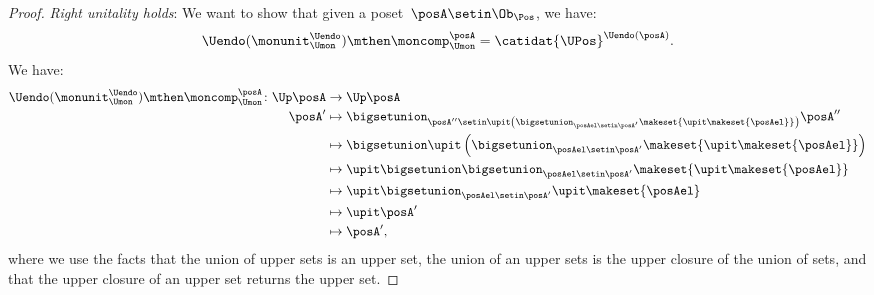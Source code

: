 \begin{proof}
    \emph{Right unitality holds}: We want to show that given a poset~$\posA\setin \Ob_\Pos$, we have:
    \begin{equation}
        \Uendo(\monunit_{\Umon}^{\Uendo})\mthen \moncomp_{\Umon}^{\posA}=\catidat{\UPos}^{\Uendo(\posA)}.
    \end{equation}
    We have:
    \begin{equation}
        \begin{aligned}
            \Uendo(\monunit_{\Umon}^{\Uendo})\mthen \moncomp_{\Umon}^{\posA}\colon \Up \posA & \to \Up \posA \\
            \posA'                                                                           & \mapsto \bigsetunion_{\posA''\setin \upit \left( \bigsetunion_{\posAel \setin \posA'}\makeset{ \upit \makeset{\posAel}}\right)}\posA'' \\
                                                                                             & \mapsto \bigsetunion \upit \left( \bigsetunion_{\posAel \setin \posA'}\makeset{\upit \makeset{ \posAel} }\right) \\
                                                                                             & \mapsto \upit \bigsetunion   \bigsetunion_{\posAel \setin \posA'}\makeset{\upit \makeset{ \posAel} } \\
                                                                                             & \mapsto \upit \bigsetunion_{\posAel \setin \posA'}\upit \makeset{ \posAel} \\
                                                                                             & \mapsto \upit \posA' \\
                                                                                             & \mapsto \posA',
        \end{aligned}
    \end{equation}
    where we use the facts that the union of upper sets is an upper set, the union of an upper sets is the upper closure of the union of sets, and that the upper closure of an upper set returns the upper set.


\end{proof}
